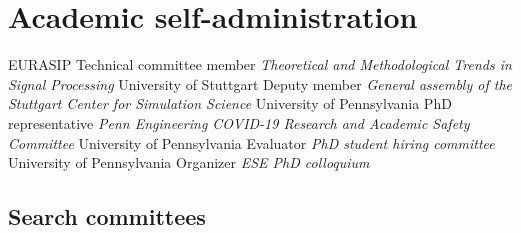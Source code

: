 \documentclass{cvlfoc}
\begin{document}
\begin{entrydate}


\end{entrydate}



\section*{Academic self-administration}

\begin{entrydate}
		{EURASIP}
		{Technical committee member}
		{\textit{Theoretical and Methodological Trends
			in Signal Processing}}
		{University of Stuttgart}
		{Deputy member}
		{\textit{General assembly of the Stuttgart Center for Simulation Science}}
		{University of Pennsylvania}
		{PhD representative}
		{\textit{Penn Engineering COVID-19 Research and Academic Safety Committee}}
		{University of Pennsylvania}
		{Evaluator}
		{\textit{PhD student hiring committee}}
		{University of Pennsylvania}
		{Organizer}
		{\textit{ESE PhD colloquium}}
\end{entrydate}


\subsection*{Search committees}
\end{document}
